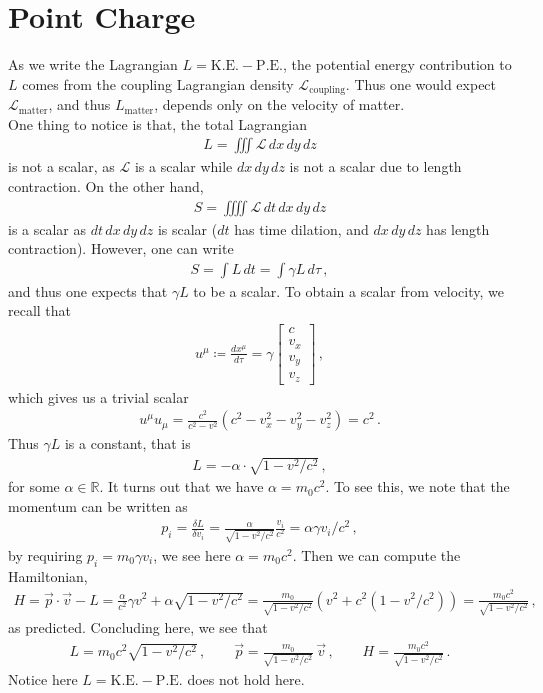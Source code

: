 \documentclass[11pt, onesided]{book}
\theoremstyle{break}
\theoremstyle{break}
\newcommand{\R}{\mathbb{R}}
\newcommand{\bmat}[1]{\begin{bmatrix} #1 \end{bmatrix}}
\begin{document}
\newpage
\section[Point Charge]{\color{red} Point Charge\color{black}}
As we write the Lagrangian $L = \text{K.E.} - \text{P.E.}$, the potential energy contribution to $L$ comes from the coupling Lagrangian density $\mathcal{L}_{\text{coupling}}$. Thus one would expect $\mathcal{L}_{\text{matter}}$, and thus $L_{\text{matter}}$, depends only on the velocity of matter.\\

One thing to notice is that, the total Lagrangian
\begin{align*}
L = \iiint \mathcal{L}\, dx\, dy\, dz
\end{align*}
is not a scalar, as $\mathcal{L}$ is a scalar while $dx\,dy\,dz$ is not a scalar due to length contraction. On the other hand, 
\begin{align*}
S = \iiiint \mathcal{L}\, dt\,dx\,dy\,dz
\end{align*}
is a scalar as $dt\,dx\,dy\,dz$ is scalar ($dt$ has time dilation, and $dx\,dy\,dz$ has length contraction). However, one can write
\begin{align*}
S = \int L\, dt = \int \gamma L\, d\tau\,,
\end{align*}
and thus one expects that $\gamma L$ to be a scalar. To obtain a scalar from velocity, we recall that
\begin{align*}
u^\mu \coloneqq \frac{dx^\mu}{d\tau} = \gamma \bmat{c \\ v_x \\ v_y \\ v_z}\,,
\end{align*}
which gives us a trivial scalar
\begin{align*}
u^\mu u_\mu = \frac{c^2}{c^2 - v^2} ( c^2 - v_x^2 - v_y^2 - v_z^2) = c^2\,.
\end{align*}
Thus $\gamma L $ is a constant, that is
\begin{align*}
L = -\alpha\cdot \sqrt{1 - v^2/c^2}\,,
\end{align*}
for some $\alpha \in \R$. It turns out that we have $\alpha = m_0c^2$. To see this, we note that the momentum can be written as
\begin{align*}
p_i = \frac{\delta L}{\delta v_i} = \frac{\alpha}{\sqrt{1- v^2/c^2}}\frac{v_i}{c^2} = \alpha \gamma v_i/c^2\,,
\end{align*}
by requiring $p_i = m_0 \gamma v_i$, we see here $\alpha = m_0 c^2$. Then we can compute the Hamiltonian,
\begin{align*}
H= \vec{p}\cdot \vec{v} - L= \frac{\alpha}{c^2}\gamma v^2 + \alpha \sqrt{1-v^2/c^2}= \frac{m_0}{\sqrt{1-v^2/c^2}}\left( v^2 + c^2 ( 1- v^2/c^2)\right) = \frac{m_0c^2}{\sqrt{1-v^2/c^2}}\,,
\end{align*}
as predicted. Concluding here, we see that
\begin{align*}
L = m_0 c^2 \sqrt{1- v^2/c^2}\,,\qquad
\vec{p} = \frac{m_0}{\sqrt{1-v^2/c^2}}\, \vec{v}\,,\qquad
H = \frac{m_0c^2}{\sqrt{1-v^2/c^2}}\,.
\end{align*}
Notice here $L = \text{K.E.}- \text{P.E.}$ does not hold here.\\
\end{document}
